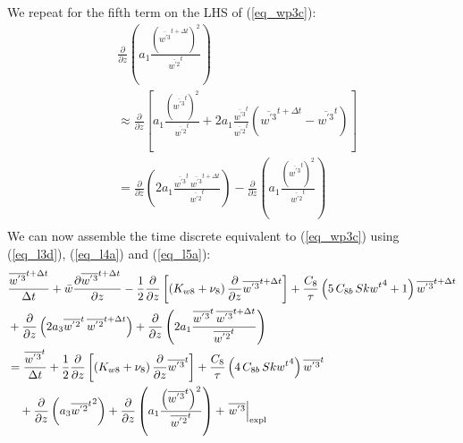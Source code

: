 \documentclass[11pt,fleqn]{article}
\newcommand{\ptlder}[2]{\frac{\partial #1}{\partial #2}}
\begin{document}
%
We repeat for the fifth term on the LHS of (\ref{eq_wp3c}):
%
\begin{equation}
\label{eq_l5a}
\begin{split}
& \ptlder{}{z} 
     \left(
        a_1 \frac{ \left( {\overline{w^{'3}}^{t + \Delta t}}\right)^2 }
                 { \overline{w^{'2}}^t }
     \right) \\
&\approx
  \ptlder{}{z}
  \left[
    a_1 \frac{ \left( {\overline{w^{'3}}^t}\right)^2 }
             { \overline{w^{'2}}^t }
  + 2 a_1 \frac{ \overline{w^{'3}}^t }{ \overline{w^{'2}}^t }
          \left( \overline{w^{'3}}^{t+\Delta t} - \overline{w^{'3}}^{t} \right) 
  \right] \\
&=
  \ptlder{}{z}
  \left(
    2 a_1 \frac{ \overline{w^{'3}}^t \, \overline{w^{'3}}^{t+\Delta t} }
               { \overline{w^{'2}}^t }
  \right)
- \ptlder{}{z}
  \left(
    a_1 \frac{ \left( {\overline{w^{'3}}^t}\right)^2 }
             { \overline{w^{'2}}^t }
  \right) \\
\end{split}
\end{equation}
%
We can now assemble the time discrete equivalent to (\ref{eq_wp3c}) using
(\ref{eq_l3d}), (\ref{eq_l4a}) and (\ref{eq_l5a}):
%
\begin{equation}
\label{eq_wp3d}
\begin{split}
& \frac{\overline{w^{'3}}^{t+\Delta t}}{\Delta t} 
+ \bar{w}\ptlder{\overline{w^{'3}}^{t+\Delta t}}{z}	 
- \frac{1}{2}\ptlder{}{z} \left[ \left( K_{w8} + \nu_8 \right)
                                 \ptlder{}{z} \overline{w^{'3}}^{t+\Delta t} 
                          \right]
+ \frac{C_8}{\tau}
   \left(  5 \, C_{8b} \, {Skw^t}^4 + 1 \right)
   \overline{w^{'3}}^{t + \Delta t}
\\ &
+ \ptlder{}{z} \left( 2 a_3 \overline{w^{'2}}^t \, \overline{w^{'2}}^{t+\Delta t} \right)
+ \ptlder{}{z}
  \left(
    2 a_1 \frac{ \overline{w^{'3}}^t \, \overline{w^{'3}}^{t+\Delta t} }
               { \overline{w^{'2}}^t }
  \right)
\\
&=
  \frac{\overline{w^{'3}}^{t}}{\Delta t} 
  + \frac{1}{2}\ptlder{}{z} \left[ \left( K_{w8} + \nu_8 \right)
                                   \ptlder{}{z} \overline{w^{'3}}^{t} 
                            \right]
  +  \frac{C_8}{\tau}
      \left( 4 \, C_{8b} \, {Skw^t}^4 \right) \overline{w^{'3}}^t
\\ & \quad
  + \ptlder{}{z} \left( a_3 {\overline{w^{'2}}^t}^2 \right)
  + \ptlder{}{z}
    \left(
      a_1 \frac{ \left( {\overline{w^{'3}}^t}\right)^2 }
               { \overline{w^{'2}}^t }
    \right)
  + \left. \overline{w^{'3}} \right|_{\rm expl}
\end{split}
\end{equation}
\end{document}
